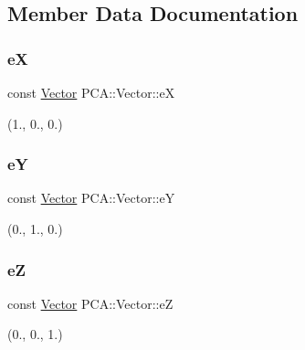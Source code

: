 \subsection{Member Data Documentation}
\hypertarget{class_p_c_a_1_1_vector_a2583e534812667f9e5cd69f53569c86b}{}\label{class_p_c_a_1_1_vector_a2583e534812667f9e5cd69f53569c86b} 
\subsubsection{\texorpdfstring{eX}{eX}}
{\footnotesize\ttfamily const \hyperlink{class_p_c_a_1_1_vector}{Vector} P\+C\+A\+::\+Vector\+::eX\hspace{0.3cm}{\ttfamily [static]}}



(1., 0., 0.) 

\hypertarget{class_p_c_a_1_1_vector_ac937f2d1b63ca297cfa3c6d1eac26e1e}{}\label{class_p_c_a_1_1_vector_ac937f2d1b63ca297cfa3c6d1eac26e1e} 
\subsubsection{\texorpdfstring{eY}{eY}}
{\footnotesize\ttfamily const \hyperlink{class_p_c_a_1_1_vector}{Vector} P\+C\+A\+::\+Vector\+::eY\hspace{0.3cm}{\ttfamily [static]}}



(0., 1., 0.) 

\hypertarget{class_p_c_a_1_1_vector_a33a36b16ca1a698b6a0e730222406287}{}\label{class_p_c_a_1_1_vector_a33a36b16ca1a698b6a0e730222406287} 
\subsubsection{\texorpdfstring{eZ}{eZ}}
{\footnotesize\ttfamily const \hyperlink{class_p_c_a_1_1_vector}{Vector} P\+C\+A\+::\+Vector\+::eZ\hspace{0.3cm}{\ttfamily [static]}}



(0., 0., 1.) 

\hypertarget{class_p_c_a_1_1_vector_a6ef8075198903147f945d0ec81b8defd}{}\label{class_p_c_a_1_1_vector_a6ef8075198903147f945d0ec81b8defd} 
